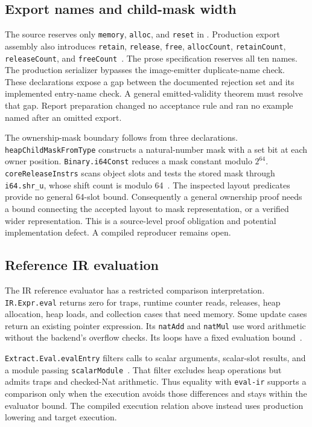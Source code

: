 \documentclass[11pt]{article}
\newcommand{\code}[1]{\texttt{#1}}
\newcommand{\longcode}[1]{\texttt{\seqsplit{#1}}}
\begin{document}
\subsection{Export names and child-mask width}

The source reserves only \code{memory}, \code{alloc}, and \code{reset} in \longcode{Extract.Core.reservedExportNames}.  Production export assembly also introduces \code{retain}, \code{release}, \code{free}, \code{allocCount}, \code{retainCount}, \code{releaseCount}, and \code{freeCount}~\cite{extract,binary}.  The prose specification reserves all ten names.  The production serializer bypasses the image-emitter duplicate-name check.  These declarations expose a gap between the documented rejection set and its implemented entry-name check.  A general emitted-validity theorem must resolve that gap.  Report preparation changed no acceptance rule and ran no example named after an omitted export.

The ownership-mask boundary follows from three declarations.  \code{heapChildMaskFromType} constructs a natural-number mask with a set bit at each owner position.  \code{Binary.i64Const} reduces a mask constant modulo $2^{64}$.  \code{coreReleaseInstrs} scans object slots and tests the stored mask through \code{i64.shr\_u}, whose shift count is modulo 64~\cite{values,binary,wasm}.  The inspected layout predicates provide no general 64-slot bound.  Consequently a general ownership proof needs a bound connecting the accepted layout to mask representation, or a verified wider representation.  This is a source-level proof obligation and potential implementation defect.  A compiled reproducer remains open.

\subsection{Reference IR evaluation}

The IR reference evaluator has a restricted comparison interpretation.  \code{IR.Expr.eval} returns zero for traps, runtime counter reads, releases, heap allocation, heap loads, and collection cases that need memory.  Some update cases return an existing pointer expression.  Its \code{natAdd} and \code{natMul} use word arithmetic without the backend's overflow checks.  Its loops have a fixed evaluation bound~\cite{ir}.

\code{Extract.Eval.evalEntry} filters calls to scalar arguments, scalar-slot results, and a module passing \code{scalarModule}~\cite{ireval}.  That filter excludes heap operations but admits traps and checked-Nat arithmetic.  Thus equality with \code{eval-ir} supports a comparison only when the execution avoids those differences and stays within the evaluator bound.  The compiled execution relation above instead uses production lowering and target execution.
\end{document}
